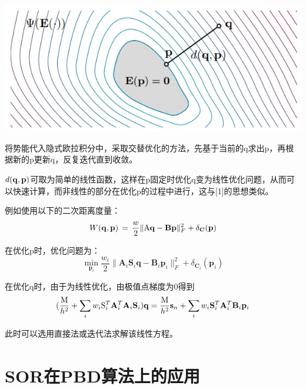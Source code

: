 \documentclass{CLGPY}
\begin{document}
\begin{multicols}{2}
        \begin{center}
            \includegraphics[width=1.0\linewidth]{./fig/材料弹性势.jpg}
        \end{center}

		将势能代入隐式欧拉积分中，采取交替优化的方法，先基于当前的q求出p，再根据新的p更新q，反复迭代直到收敛。

		$d({\bf q},{\bf p})$可取为简单的线性函数，这样在p固定时优化q变为线性优化问题，从而可以快速计算，而非线性的部分在优化p的过程中进行，这与[1]的思想类似。

		例如使用以下的二次距离度量：
       \begin{equation}
			W({\bf q},{\bf p})\,=\,\frac{w}{2}\|\mathrm{A}{\bf q}-{\bf B}{\bf p}\|_{F}^{2}+\delta_{\bf C}({\bf p})
		\end{equation}

		在优化p时，优化问题为：
		\begin{equation}
			\operatorname*{min}_{\mathbf{p}_{i}}{\frac{w_{i}}{2}}\|\mathbf{A}_{i}\mathbf{S}_{i}\mathbf{q}-\mathbf{B}_{i}\mathbf{p}_{i}\|_{F}^{2}+\delta_{\mathbf{C}_{i}}(\mathbf{p}_{i})
		\end{equation}
		
		在优化q时，由于为线性优化，由极值点梯度为0得到
       \begin{equation}
			(\frac{\mathrm{M}}{h^{2}}+\sum_{i}w_{i}\mathrm{S}_{i}^{T}{\bf A}_{i}^{T}{\bf A}_{i}{\bf S}_{i}){\bf q}=\frac{\mathrm{M}}{h^{2}}{\bf s}_{n}+\sum_{i}w_{i}{\bf S}_{i}^{T}{\bf A}_{i}^{T}{\bf B}_{i}{\bf p}_{i}
		\end{equation}

		此时可以选用直接法或迭代法求解该线性方程。

		\section{SOR在PBD算法上的应用\textsuperscript{\cite{3}}}


\end{multicols}
\end{document}
